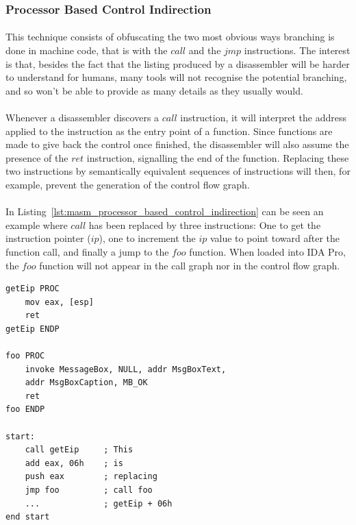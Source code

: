 \subsubsection{Processor Based Control Indirection}
\paragraph{}
This technique consists of obfuscating the two most obvious ways branching is done in machine code, that is with the $call$ and the $jmp$ instructions. The interest is that, besides the fact that the listing produced by a disassembler will be harder to understand for humans, many tools will not recognise the potential branching, and so won't be able to provide as many details as they usually would. 

\paragraph{}
Whenever a disassembler discovers a $call$ instruction, it will interpret the address applied to the instruction as the entry point of a function. Since functions are made to give back the control once finished, the disassembler will also assume the presence of the $ret$ instruction, signalling the end of the function. Replacing these two instructions by semantically equivalent sequences of instructions will then, for example, prevent the generation of the control flow graph.

\paragraph{}
In Listing~\ref{lst:masm_processor_based_control_indirection} can be seen an example where $call$ has been replaced by three instructions: One to get the instruction pointer ($ip$), one to increment the $ip$ value to point toward after the function call, and finally a jump to the $foo$ function. When loaded into IDA Pro, the $foo$ function will not appear in the call graph nor in the control flow graph. \\

\begin{lstlisting}[caption={MASM code which hides the function call to $foo$ by using a set of instructions with an equivalent effect.}, label={lst:masm_processor_based_control_indirection}, frame=tlrb, language={[x86masm]Assembler}]
getEip PROC
	mov eax, [esp]
	ret
getEip ENDP

foo PROC
	invoke MessageBox, NULL, addr MsgBoxText, 
	addr MsgBoxCaption, MB_OK
	ret
foo ENDP

start:
	call getEip		; This
	add eax, 06h	; is
	push eax		; replacing
	jmp foo			; call foo
	...				; getEip + 06h
end start
\end{lstlisting}

